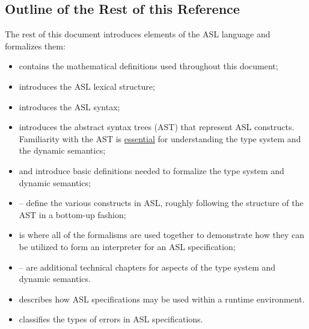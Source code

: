 \subsection{Outline of the Rest of this Reference}
The rest of this document introduces elements of the ASL language
and formalizes them:
\begin{itemize}
    \item {} contains the mathematical definitions used
        throughout this document;
    \item {} introduces the ASL lexical structure;
    \item {} introduces the ASL syntax;
    \item {} introduces the abstract syntax trees (AST)
        that represent ASL constructs.
        Familiarity with the AST is \underline{essential} for understanding the
        type system and the dynamic semantics;
    \item {} and  introduce basic
        definitions needed to formalize the type system and dynamic semantics;
    \item {}--
        define the various constructs in ASL, roughly following the structure of the AST
        in a bottom-up fashion;
    \item {} is where all of the formalisms are used together to
        demonstrate how they can be utilized to form an interpreter for an ASL specification;
    \item {}-- are additional
        technical chapters for aspects of the type system and dynamic semantics.
    \item {} describes how ASL specifications may be used
        within a runtime environment.
    \item {} classifies the types of errors in ASL specifications.
\end{itemize}
